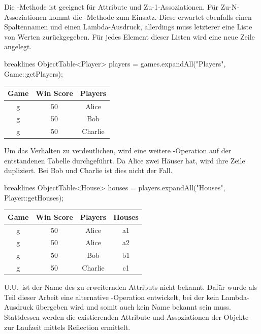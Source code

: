 Die -Methode ist geeignet für Attribute und Zu-1-Assoziationen.
Für Zu-N-Assoziationen kommt die -Methode zum Einsatz.
Diese erwartet ebenfalls einen Spaltennamen und einen Lambda-Ausdruck,
allerdings muss letzterer eine Liste von Werten zurückgegeben.
Für jedes Element dieser Listen wird eine neue Zeile angelegt.

\begin{jcodeblock*}{breaklines}
    ObjectTable<Player> players = games.expandAll("Players", Game::getPlayers);
\end{jcodeblock*}

\begin{tabular}{|c|c|c|}
    \hline
    \textbf{Game} & \textbf{Win Score} & \textbf{Players} \\
    \hline
    g & 50 & Alice   \\
    g & 50 & Bob     \\
    g & 50 & Charlie \\
    \hline
\end{tabular}

Um das Verhalten zu verdeutlichen, wird eine weitere -Operation auf der entstandenen Tabelle durchgeführt.
Da Alice zwei Häuser hat, wird ihre Zeile dupliziert.
Bei Bob und Charlie ist dies nicht der Fall.

\begin{jcodeblock*}{breaklines}
    ObjectTable<House> houses = players.expandAll("Houses", Player::getHouses);
\end{jcodeblock*}

\begin{tabular}{|c|c|c|c|}
    \hline
    \textbf{Game} & \textbf{Win Score} & \textbf{Players} & \textbf{Houses} \\
    \hline
    g & 50 & Alice   & a1 \\
    g & 50 & Alice   & a2 \\
    g & 50 & Bob     & b1 \\
    g & 50 & Charlie & c1 \\
    \hline
\end{tabular}

U.U.\ ist der Name des zu erweiternden Attributs nicht bekannt.
Dafür wurde als Teil dieser Arbeit eine alternative -Operation entwickelt,
bei der kein Lambda-Ausdruck übergeben wird und somit auch kein Name bekannt sein muss.
Stattdessen werden die existierenden Attribute und Assoziationen der Objekte zur Laufzeit mittels Reflection ermittelt.

